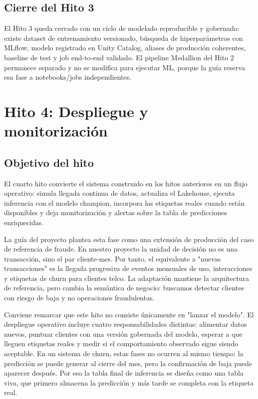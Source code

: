 \documentclass[12pt,a4paper]{article}
\begin{document}
\subsection{Cierre del Hito 3}

El Hito 3 queda cerrado con un ciclo de modelado reproducible y gobernado: existe dataset de entrenamiento versionado, búsqueda de hiperparámetros con MLflow, modelo registrado en Unity Catalog, aliases de producción coherentes, baseline de test y job end-to-end validado. El pipeline Medallion del Hito 2 permanece separado y no se modifica para ejecutar ML, porque la guía reserva esa fase a notebooks/jobs independientes.\par

\section{Hito 4: Despliegue y monitorización}

\subsection{Objetivo del hito}

El cuarto hito convierte el sistema construido en los hitos anteriores en un flujo operativo: simula llegada continua de datos, actualiza el Lakehouse, ejecuta inferencia con el modelo champion, incorpora las etiquetas reales cuando están disponibles y deja monitorización y alertas sobre la tabla de predicciones enriquecidas.\par

La guía del proyecto plantea esta fase como una extensión de producción del caso de referencia de fraude. En nuestro proyecto la unidad de decisión no es una transacción, sino el par cliente-mes. Por tanto, el equivalente a "nuevas transacciones" es la llegada progresiva de eventos mensuales de uso, interacciones y etiquetas de churn para clientes telco. La adaptación mantiene la arquitectura de referencia, pero cambia la semántica de negocio: buscamos detectar clientes con riesgo de baja y no operaciones fraudulentas.\par

Conviene remarcar que este hito no consiste únicamente en "lanzar el modelo". El despliegue operativo incluye cuatro responsabilidades distintas: alimentar datos nuevos, puntuar clientes con una versión gobernada del modelo, esperar a que lleguen etiquetas reales y medir si el comportamiento observado sigue siendo aceptable. En un sistema de churn, estas fases no ocurren al mismo tiempo: la predicción se puede generar al cierre del mes, pero la confirmación de baja puede aparecer después. Por eso la tabla final de inferencia se diseña como una tabla viva, que primero almacena la predicción y más tarde se completa con la etiqueta real.\par
\end{document}

